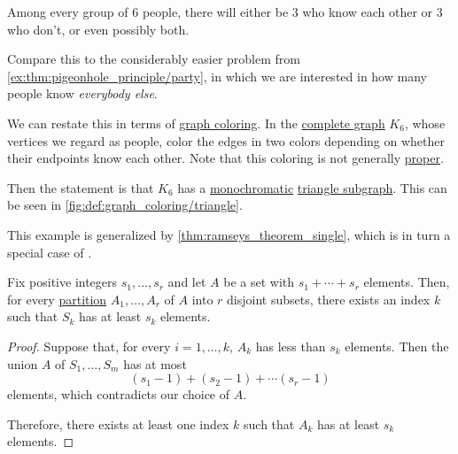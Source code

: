 \begin{example}\label{ex:ramsey_party_problem}
  Among every group of \( 6 \) people, there will either be \( 3 \) who know each other or \( 3 \) who don't, or even possibly both.

  Compare this to the considerably easier problem from \cref{ex:thm:pigeonhole_principle/party}, in which we are interested in how many people know \emph{everybody else}.

  We can restate this in terms of \hyperref[def:graph_coloring]{graph coloring}. In the \hyperref[def:complete_graph]{complete graph} \( K_6 \), whose vertices we regard as people, color the edges in two colors depending on whether their endpoints know each other. Note that this coloring is not generally \hyperref[def:graph_coloring/proper]{proper}.

  Then the statement is that \( K_6 \) has a \hyperref[def:set_coloring/monochromatic]{monochromatic} \hyperref[def:triangle_graph]{triangle subgraph}. This can be seen in \cref{fig:def:graph_coloring/triangle}.

  This example is generalized by \cref{thm:ramseys_theorem_single}, which is in turn a special case of .
\end{example}

\begin{lemma}\label{thm:ramsey_number_lemma}
  Fix positive integers \( s_1, \ldots, s_r \) and let \( A \) be a set with \( s_1 + \cdots + s_r \) elements. Then, for every \hyperref[def:set_partition]{partition} \( A_1, \ldots, A_r \) of \( A \) into \( r \) disjoint subsets, there exists an index \( k \) such that \( S_k \) has at least \( s_k \) elements.
\end{lemma}
\begin{proof}
  Suppose that, for every \( i = 1, \ldots, k \), \( A_k \) has less than \( s_k \) elements. Then the union \( A \) of \( S_1, \ldots, S_m \) has at most
  \begin{equation*}
    (s_1 - 1) + (s_2 - 1) + \cdots (s_r - 1)
  \end{equation*}
  elements, which contradicts our choice of \( A \).

  Therefore, there exists at least one index \( k \) such that \( A_k \) has at least \( s_k \) elements.
\end{proof}

